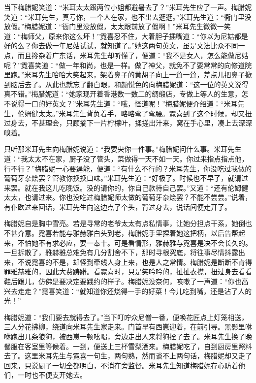 \par 当下梅腊妮笑道：“米耳太太跟两位小姐都避暑去了？”米耳先生应了一声。梅腊妮笑道：“米耳先生，真亏你，一个人在家，也不出去逛逛。”米耳先生道：“衙门里没放假。”梅腊妮道：“衙门里没放假，太太跟前放了假啊！”米耳先生微微一笑道：“梅师父，原来你这么坏！”霓喜忍不住，大着胆子插嘴道：“你以为尼姑都是好的么？你去做一年尼姑试试，就知道了。”她这两句英文，虽是文法比众不同一点，而且搀杂着广东话，米耳先生却听懂了，便道：“我不是女人，怎么能做尼姑呢？”霓喜笑道：“做一年和尚，也是一样。做了神父，就免不了要常常的向修道院里跑。”米耳先生哈哈大笑起来，架着鼻子的黄胡子向上一耸一耸，差点儿把鼻子掀到脑后去了。从此也就忘了翻白眼，和颜悦色的向梅腊妮道：“这一位的英文说得真不错。”梅腊妮道：“她家现开着香港数一数二的绸缎店，专做上等人的生意，怎不说得一口的好英文？”米耳先生道：“哦，怪道呢！”梅腊妮便介绍道：“米耳先生，伦姆健太太。”米耳先生背负着手，略略弯了弯腰。霓喜到了这个时候，却又扭过身去，不甚理会，只顾摘下一片柠檬叶，揉搓出汁来，窝在手心里，凑上去深深嗅着。
\par 只听那米耳先生向梅腊妮说道：“我要央你一件事。”梅腊妮问什么事。米耳先生道：“我太太不在家，厨子没了管头，菜做得一天不如一天。你过来指点指点他，行不行？”梅腊妮一心要逞能，便道：“有什么不行的？米耳先生，你没吃过我做的葡萄牙杂烩罢？管教你换换口味。”米耳先生道：“好极了。时候也不早了，就请过来罢。就在我这儿吃晚饭。没的请你的，你自己款待自己罢。”又道：“还有伦姆健太太，也请过来。你也没吃过梅腊妮师太做的葡萄牙杂烩罢？不能不尝尝。”说着，有仆欧过来回话，米耳先生向这边点了个头，背过身去，说话间便走开了。
\par 梅腊妮自是胸中雪亮。若是寻常的老爷太太有点私情事，让她分担点干系，她倒也不甚介意。霓喜若能与雅赫雅白头到老，梅腊妮手里捏着她这把柄，以后告帮起来，不怕她不有求必应，要一奉十。可是看情形，雅赫雅与霓喜是决不会长久的。一旦拆散了，雅赫雅总难免有几分割舍不下，那时寻根究底，将往事尽情抖露出来，不说霓喜的不是，却怪到牵线人身上来，也是人之常情。梅腊妮是断断不肯得罪雅赫雅的，因此大费踌躇。看霓喜时，只是笑吟吟的，扯扯衣襟，扭过身去看看鞋后跟儿，仿佛是要决定要践约的样子。梅腊妮没奈何，咳嗽了一声道：“你也高兴去走走？”霓喜笑道：“就知道你还烧得一手的好菜！今儿吃到嘴，还是沾了人的光！”
\par 梅腊妮道：“我们要去就得去了。”当下叮咛众尼僧一番，便唤花匠点上灯笼相送，三人分花拂柳，绕道向米耳先生家走来。门首早有西崽迎着，在前引导。黑影里咻咻跑出几条狼狗，被西崽一顿吆喝，旁边走出人来将狗拴了去了。米耳先生换了晚餐服在客室里等候着。一到，便送上三杯雪梨酒来。梅腊妮吃了，自到厨房里照料去了。这里米耳先生与霓喜一句生，两句熟，然而谈不上两句话，梅腊妮却又走了回来，只说厨子一切全都明白，不消在旁监督。米耳先生知道梅腊妮存心防着他们，一时也不便支开她去。
